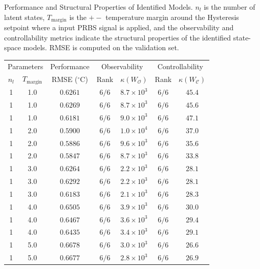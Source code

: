 
    \caption{Performance and Structural Properties of Identified Models. $n_l$ is the number of latent states, $T_{\mathrm{margin}}$ is the $+-$ temperature margin around the Hysteresis setpoint where a input PRBS signal is applied, and the observability and controllability metrics indicate the structural properties of the identified state-space models. RMSE is computed on the validation set.}
    \label{tab:model_analysis}
    \begin{tabular}{cc c cc cc}
        \toprule
        \multicolumn{2}{c}{Parameters} & \multicolumn{1}{c}{Performance} & \multicolumn{2}{c}{Observability} & \multicolumn{2}{c}{Controllability} \\
        \cmidrule(lr){1-2} \cmidrule(lr){3-3} \cmidrule(lr){4-5} \cmidrule(lr){6-7}
        $n_l$ & $T_{\mathrm{margin}}$ & RMSE ($^\circ$C) & Rank & $\kappa(W_{\mathcal{O}})$ & Rank & $\kappa(W_{\mathcal{C}})$ \\
        \midrule
1 & 1.0 & $0.6261$ & $6/6$ & $8.7 \times 10^{3}$ & $6/6$ & $45.4$ \\
        1 & 1.0 & $0.6269$ & $6/6$ & $8.7 \times 10^{3}$ & $6/6$ & $45.6$ \\
        1 & 1.0 & $0.6181$ & $6/6$ & $9.0 \times 10^{3}$ & $6/6$ & $47.1$ \\
        1 & 2.0 & $0.5900$ & $6/6$ & $1.0 \times 10^{4}$ & $6/6$ & $37.0$ \\
        1 & 2.0 & $0.5886$ & $6/6$ & $9.6 \times 10^{3}$ & $6/6$ & $35.6$ \\
        1 & 2.0 & $0.5847$ & $6/6$ & $8.7 \times 10^{3}$ & $6/6$ & $33.8$ \\
        1 & 3.0 & $0.6264$ & $6/6$ & $2.2 \times 10^{3}$ & $6/6$ & $28.1$ \\
        1 & 3.0 & $0.6292$ & $6/6$ & $2.2 \times 10^{3}$ & $6/6$ & $28.1$ \\
        1 & 3.0 & $0.6183$ & $6/6$ & $2.1 \times 10^{3}$ & $6/6$ & $28.3$ \\
        1 & 4.0 & $0.6505$ & $6/6$ & $3.9 \times 10^{3}$ & $6/6$ & $30.0$ \\
        1 & 4.0 & $0.6467$ & $6/6$ & $3.6 \times 10^{3}$ & $6/6$ & $29.4$ \\
        1 & 4.0 & $0.6435$ & $6/6$ & $3.4 \times 10^{3}$ & $6/6$ & $29.1$ \\
        1 & 5.0 & $0.6678$ & $6/6$ & $3.0 \times 10^{3}$ & $6/6$ & $26.6$ \\
        1 & 5.0 & $0.6677$ & $6/6$ & $2.8 \times 10^{3}$ & $6/6$ & $26.9$ \\

\end{tabular}
